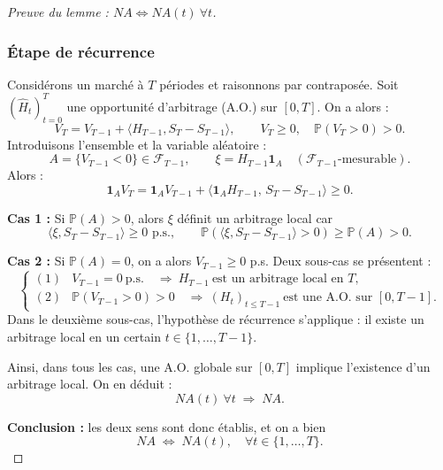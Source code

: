 \begin{proof}[Preuve du lemme : $NA \Longleftrightarrow NA(t)\ \forall t$]
\subsubsection*{Étape de récurrence}
Considérons un marché à $T$ périodes et raisonnons par contraposée.  
Soit $(\hat H_t)_{t=0}^T$ une opportunité d'arbitrage (A.O.) sur $[0,T]$.  
On a alors :
\[
V_T = V_{T-1} + \langle H_{T-1}, S_T - S_{T-1} \rangle, 
\qquad V_T \ge 0,\quad \mathbb{P}(V_T > 0) > 0.
\]
Introduisons l'ensemble et la variable aléatoire :
\[
A = \{ V_{T-1} < 0 \} \in \mathcal{F}_{T-1},
\qquad
\xi = H_{T-1}\mathbf{1}_A \quad (\mathcal{F}_{T-1}\text{-mesurable}).
\]
Alors :
\[
\mathbf{1}_A V_T
= \mathbf{1}_A V_{T-1}
+ \big\langle \mathbf{1}_A H_{T-1},\, S_T - S_{T-1} \big\rangle
\ge 0.
\]

\textbf{Cas 1 :} Si $\mathbb{P}(A) > 0$, alors $\xi$ définit un arbitrage local car
\[
\langle \xi, S_T - S_{T-1} \rangle \ge 0 \text{ p.s.}, 
\qquad 
\mathbb{P}(\langle \xi, S_T - S_{T-1} \rangle > 0) \ge \mathbb{P}(A) > 0.
\]

\textbf{Cas 2 :} Si $\mathbb{P}(A) = 0$, on a alors $V_{T-1} \ge 0$ p.s.  
Deux sous-cas se présentent :
\[
\begin{cases}
(1) & V_{T-1} = 0\ \text{p.s.} 
\quad \Rightarrow\ H_{T-1}\ \text{est un arbitrage local en } T, \\[0.5em]
(2) & \mathbb{P}(V_{T-1}>0) > 0 
\quad \Rightarrow\ (H_t)_{t\le T-1}\ \text{est une A.O. sur } [0,T-1].
\end{cases}
\]
Dans le deuxième sous-cas, l'hypothèse de récurrence s'applique : il existe un arbitrage local 
en un certain $t \in \{1,\ldots,T-1\}$.

Ainsi, dans tous les cas, une A.O. globale sur $[0,T]$ implique l'existence d'un arbitrage local.  
On en déduit :
\[
NA(t)\ \forall t \;\Rightarrow\; NA.
\]

\textbf{Conclusion :} les deux sens sont donc établis, et on a bien
\[
NA \;\Longleftrightarrow\; NA(t), \quad \forall t\in\{1,\ldots,T\}.
\]
\end{proof}
